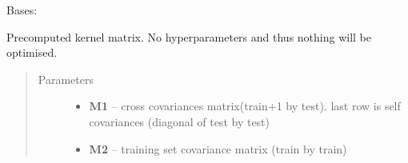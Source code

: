 \documentclass[letterpaper,10pt,english]{sphinxmanual}
\begin{document}
\begin{fulllineitems}
\label{pyGPs.Core:pyGPs.Core.cov.Pre}
Bases: {\hyperref[pyGPs.Core:pyGPs.Core.cov.Kernel]{}}

Precomputed kernel matrix. No hyperparameters and thus nothing will be optimised.
\begin{quote}\begin{description}
\item[{Parameters}] \leavevmode\begin{itemize}
\item {} 
\textbf{M1} -- cross covariances matrix(train+1 by test).
last row is self covariances (diagonal of test by test)

\item {} 
\textbf{M2} -- training set covariance matrix (train by train)

\end{itemize}

\end{description}\end{quote}

\begin{fulllineitems}
\label{pyGPs.Core:pyGPs.Core.cov.Pre.getCovMatrix}
\end{fulllineitems}


\begin{fulllineitems}
\label{pyGPs.Core:pyGPs.Core.cov.Pre.getDerMatrix}
\end{fulllineitems}


\end{fulllineitems}

\end{document}
